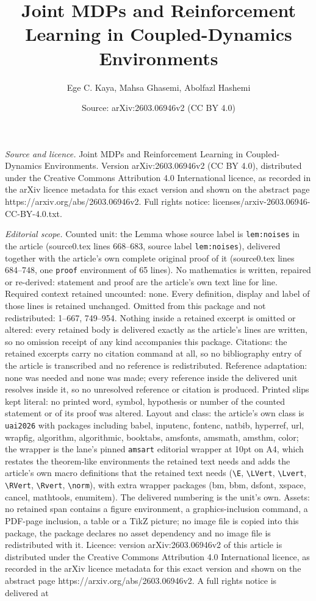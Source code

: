 \documentclass[10pt,a4paper]{amsart}
\title[Joint MDPs and Reinforcement Learning in Coupled-Dynamics En]{Joint MDPs and Reinforcement Learning in Coupled-Dynamics Environments}
\author{Ege C. Kaya, Mahsa Ghasemi, Abolfazl Hashemi}
\date{Source: arXiv:2603.06946v2 (CC BY 4.0)}
\begin{document}
\maketitle

\noindent\emph{Source and licence.} Joint MDPs and Reinforcement Learning in Coupled-Dynamics Environments. Version arXiv:2603.06946v2 (CC BY 4.0), distributed under the Creative Commons Attribution 4.0 International licence, as recorded in the arXiv licence metadata for this exact version and shown on the abstract page https://arxiv.org/abs/2603.06946v2. Full rights notice: licenses/arxiv-2603.06946-CC-BY-4.0.txt.\par\smallskip

\noindent\textit{Editorial scope.} Counted unit: the Lemma whose source label is \texttt{lem:noises} in the article (source0.tex lines 668--683, source label \texttt{lem:noises}), delivered together with the article's own complete original proof of it (source0.tex lines 684--748, one \texttt{proof} environment of 65 lines). No mathematics is written, repaired or re-derived: statement and proof are the article's own text line for line. Required context retained uncounted: none. Every definition, display and label of those lines is retained unchanged. Omitted from this package and not redistributed: 1--667, 749--954. Nothing inside a retained excerpt is omitted or altered: every retained body is delivered exactly as the article's lines are written, so no omission receipt of any kind accompanies this package. Citations: the retained excerpts carry no citation command at all, so no bibliography entry of the article is transcribed and no reference is redistributed. Reference adaptation: none was needed and none was made; every reference inside the delivered unit resolves inside it, so no unresolved reference or citation is produced. Printed slips kept literal: no printed word, symbol, hypothesis or number of the counted statement or of its proof was altered. Layout and class: the article's own class is \texttt{uai2026} with packages including babel, inputenc, fontenc, natbib, hyperref, url, wrapfig, algorithm, algorithmic, booktabs, amsfonts, amsmath, amsthm, color; the wrapper is the lane's pinned \texttt{amsart} editorial wrapper at 10pt on A4, which restates the theorem-like environments the retained text needs and adds the article's own macro definitions that the retained text needs (\texttt{\textbackslash E}, \texttt{\textbackslash LVert}, \texttt{\textbackslash Lvert}, \texttt{\textbackslash RVert}, \texttt{\textbackslash Rvert}, \texttt{\textbackslash norm}), with extra wrapper packages (bm, bbm, dsfont, xspace, cancel, mathtools, enumitem). The delivered numbering is the unit's own. Assets: no retained span contains a figure environment, a graphics-inclusion command, a PDF-page inclusion, a table or a TikZ picture; no image file is copied into this package, the package declares no asset dependency and no image file is redistributed with it. Licence: version arXiv:2603.06946v2 of this article is distributed under the Creative Commons Attribution 4.0 International licence, as recorded in the arXiv licence metadata for this exact version and shown on the abstract page https://arxiv.org/abs/2603.06946v2. A full rights notice is delivered at 
\end{document}
